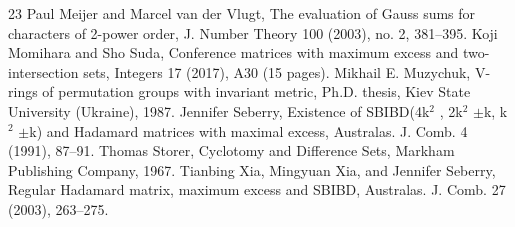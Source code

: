 \begin{thebibliography}{23}
 Paul Meijer and Marcel van der Vlugt, The evaluation of Gauss sums for characters of 2-power order, J. Number Theory 100 (2003), no. 2, 381–395.
 Koji Momihara and Sho Suda, Conference matrices with maximum excess and two-intersection sets, Integers 17 (2017), A30 (15 pages).
 Mikhail E. Muzychuk, V-rings of permutation groups with invariant metric, Ph.D. thesis, Kiev State University (Ukraine), 1987.
 Jennifer Seberry, Existence of SBIBD(4k$^2$ , 2k$^2$ $\pm$k, k$^2$ $\pm$k) and Hadamard matrices with maximal excess, Australas. J. Comb. 4 (1991), 87–91.
 Thomas Storer, Cyclotomy and Difference Sets, Markham Publishing Company, 1967.
 Tianbing Xia, Mingyuan Xia, and Jennifer Seberry, Regular Hadamard matrix, maximum excess and SBIBD, Australas. J. Comb. 27 (2003), 263–275.
\end{thebibliography}
